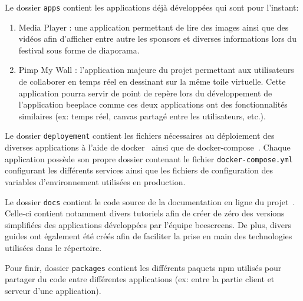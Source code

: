 Le dossier \texttt{apps} contient les applications déjà développées qui sont pour l'instant:

\begin{enumerate}
  \item Media Player : une application permettant de lire des images ainsi que des vidéos afin d'afficher entre autre les sponsors et diverses informations lors du festival sous forme de diaporama.
  \item Pimp My Wall : l'application majeure du projet permettant aux utilisateurs de collaborer en temps réel en dessinant sur la même toile virtuelle. Cette application pourra servir de point de repère lors du développement de l'application \gls{beeplace} comme ces deux applications ont des fonctionnalités similaires (ex: temps réel, canvas partagé entre les utilisateurs, etc.).
\end{enumerate}

Le dossier \texttt{deployement} contient les fichiers nécessaires au déploiement des diverses applications à l'aide de \gls{docker}~\cite{docker} ainsi que de \gls{docker-compose}~\cite{docker-compose}. Chaque application possède son propre dossier contenant le fichier  \texttt{docker-compose.yml} configurant les différents services ainsi que les fichiers de configuration des variables d'environnement utilisées en production.

Le dossier \texttt{docs} contient le code source de la documentation en ligne du projet~\cite{beescreensdocs}. Celle-ci contient notamment divers tutoriels afin de créer de zéro des versions simplifiées des applications développées par l'équipe \gls{beescreens}. De plus, divers guides ont également été créés afin de faciliter la prise en main des technologies utilisées dans le répertoire.

Pour finir, dossier \texttt{packages} contient les différents paquets \gls{npm} utilisés pour partager du code entre différentes applications (ex: entre la partie client et serveur d'une application).




